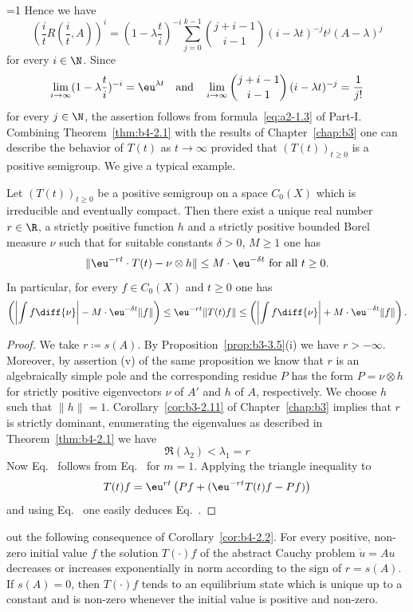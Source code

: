 %
=1 
Hence we have
%
\[
	(\frac{i}{t}R(\frac{i}{t},A))^i = (1-\lambda\frac{t}{i})^{-i}\sum_{j=0}^{k-1}\binom{j+i-1}{i-1}(i-\lambda t)^{-j}t^j(A-\lambda)^j 
\]
%
for every $i \in \N$.
Since 
%
\[
	 \lim_{i\to\infty}(1-\lambda\frac{t}{i})^{-i} = \eu^{\lambda t}
	 \quad \text{and} \quad \lim_{i\to\infty}\binom{j+i-1}{i-1}\,(i-\lambda t)^{-j} = \frac{1}{j!}
\]
%
for every $j \in \N$, the assertion follows from 
formula~\eqref{eq:a2-1.3} of Part-I.
\fi
Combining Theorem~\ref{thm:b4-2.1} with the results of Chapter~\ref{chap:b3} one can describe
the behavior of\/ $T(t)$ as $t \to \infty$ provided that $(T(t))_{t \geq 0}$ is a positive semigroup.
We give a typical example.
\begin{corollary}\label{cor:b4-2.2}
	Let $(T(t))_{t \geq 0}$ be a positive semigroup on a space
	$C_{0}(X)$ which is irreducible and eventually compact.
	Then there exist a
	unique real number $r \in \R$, a strictly positive function $h$ and a
	strictly positive bounded Borel measure $\nu$ such that for suitable
	constants $\delta > 0$, $M \geq 1$ one has
	\begin{equation}\label{eq:b4-2.2}
		\|\eu^{-rt}\cdot T(t) - \nu\otimes h\| \leq M\cdot \eu^{-\delta t} \text{ for all } t \geq 0 .
	\end{equation}
	In particular, for every $f \in C_{0}(X)$ and $t \geq 0$ one has
	\begin{equation}\label{eq:b4-2.3} 
		\left(\left|\int f \diff{\nu}\right| - M\cdot \eu^{-\delta t}\|f\|\right) \leq \eu^{-rt}\|T(t)f\| \leq \left(\left|\int f \diff{\nu}\right| + M\cdot \eu^{-\delta t}\|f\|\right).
	\end{equation}
\end{corollary}
\begin{proof}
	We take $r  \coloneq  s(A)$.
	By Proposition~\ref{prop:b3-3.5}(i) we have $r > -\infty$.
	Moreover, by assertion (v) of the same proposition we know that $r$ is
	an algebraically simple pole and the corresponding residue $P$ has the
	form $P = \nu \otimes h$ for strictly positive eigenvectors $\nu$ of\/ $A'$
	and $h$ of\/ $A$, respectively.
    We choose $h$ such that 
	$\|h\| = 1$.
	Corollary~\ref{cor:b3-2.11} of Chapter~\ref{chap:b3} implies that $r$ is strictly
	dominant, \ie enumerating the eigenvalues as described in Theorem~\ref{thm:b4-2.1} we
	have 
\[
	\Re(\lambda_2) < \lambda_1 = r 
\]
Now Eq.~ follows from Eq.~ for $m = 1$.
Applying the triangle inequality to %
\[
	 T(t)f = \eu^{rt}\left(Pf + (\eu^{-rt}T(t)f-Pf)\right) 
\]
%
and using Eq.~ one easily deduces Eq.~.
\end{proof}
 out the following consequence of Corollary~\ref{cor:b4-2.2}.
For every positive, non-zero initial value $f$ the solution $T(\cdot)f$
of the abstract Cauchy problem $\dot{u} = Au$ decreases or increases
exponentially in norm according to the sign of\/ $r = s(A)$.
If\/ $s(A) = 0$, then $T(\cdot)f$ tends to an equilibrium state which is
unique up to a constant and is non-zero whenever the initial value is
positive and non-zero.

